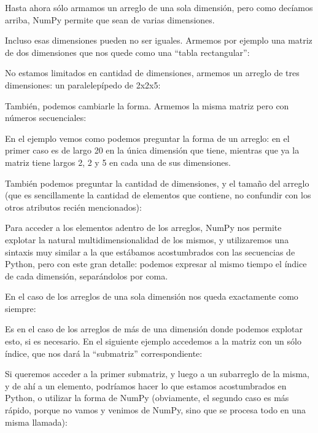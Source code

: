 Hasta ahora sólo armamos un arreglo de una sola dimensión, pero como decíamos arriba, NumPy permite que sean de varias dimensiones.

Incluso esas dimensiones pueden no ser iguales. Armemos por ejemplo una matriz de dos dimensiones que nos quede como una ``tabla rectangular'':


No estamos limitados en cantidad de dimensiones, armemos un arreglo de tres dimensiones: un paralelepípedo de 2x2x5:


También, podemos cambiarle la forma. Armemos la misma matriz pero con números secuenciales:


En el ejemplo vemos como podemos preguntar la forma de un arreglo: en el primer caso es de largo 20 en la única dimensión que tiene, mientras que ya la matriz tiene largos 2, 2 y 5 en cada una de sus dimensiones.

También podemos preguntar la cantidad de dimensiones, y el tamaño del arreglo (que es sencillamente la cantidad de elementos que contiene, no confundir con los otros atributos recién mencionados):


Para acceder a los elementos adentro de los arreglos, NumPy nos permite explotar la natural multidimensionalidad de los mismos, y utilizaremos una sintaxis muy similar a la que estábamos acostumbrados con las secuencias de Python, pero con este gran detalle: podemos expresar al mismo tiempo el índice de cada dimensión, separándolos por coma.

En el caso de los arreglos de una sola dimensión nos queda exactamente como siempre:


Es en el caso de los arreglos de más de una dimensión donde podemos explotar esto, si es necesario. En el siguiente ejemplo accedemos a la matriz con un sólo índice, que nos dará la ``submatriz'' correspondiente:


Si queremos acceder a la primer submatriz, y luego a un subarreglo de la misma, y de ahí a un elemento, podríamos hacer lo que estamos acostumbrados en Python, o utilizar la forma de NumPy (obviamente, el segundo caso es más rápido, porque no vamos y venimos de NumPy, sino que se procesa todo en una misma llamada):

